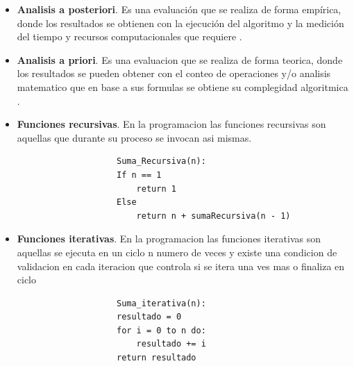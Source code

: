 \documentclass[12pt,twoside]{article}
\begin{document}
\begin{itemize}
\item \textbf{Analisis a posteriori}. Es una evaluación que se realiza de forma empírica, donde los resultados se obtienen con la ejecución del algoritmo y la medición del tiempo y recursos computacionales que requiere \cite{concep1}.

\item \textbf{Analisis a priori}. Es una evaluacion que se realiza de forma teorica, donde los resultados se pueden obtener con el conteo de operaciones y/o analisis matematico que en base a sus formulas se obtiene su complegidad algoritmica \cite{concep1}.

\item \textbf{Funciones recursivas}. En la programacion las funciones recursivas son aquellas que durante su proceso se invocan asi mismas.

\begin{centering}
\begin{verbatim}
                    Suma_Recursiva(n):
                    If n == 1
                        return 1 
                    Else
                        return n + sumaRecursiva(n - 1)
\end{verbatim}
\end{centering}

\item \textbf{Funciones iterativas}. En la programacion las funciones iterativas son aquellas se ejecuta en un ciclo n numero de veces y existe una condicion de validacion en cada iteracion que controla si se itera una ves mas o finaliza en ciclo

\begin{centering}
\begin{verbatim}
                    Suma_iterativa(n):
                    resultado = 0
                    for i = 0 to n do:
                        resultado += i
                    return resultado
\end{verbatim}
\end{centering}


\end{itemize}
\end{document}

